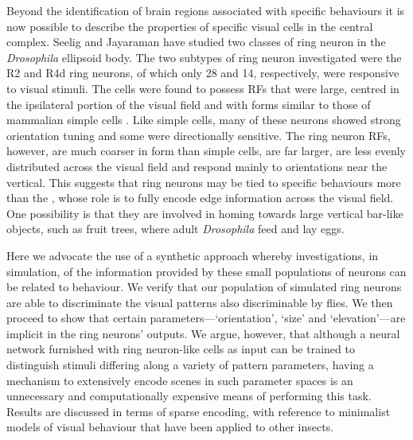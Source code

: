 Beyond the identification of brain regions associated with specific behaviours it is now possible to describe the properties of specific visual cells in the central complex. Seelig and Jayaraman \cite{Seelig2013} have studied two classes of ring neuron in the \emph{Drosophila} ellipsoid body.
The two subtypes of ring neuron investigated were the R2 and R4d ring neurons, of which only 28 and 14, respectively, were responsive to visual stimuli.
The cells were found to possess \acp{RF} that were large, centred in the ipsilateral portion of the visual field and with forms similar to those of mammalian simple cells \cite{Hubel1962}.
Like simple cells, many of these neurons showed strong orientation tuning and some were directionally sensitive.
The ring neuron \acp{RF}, however, are much coarser in form than simple cells, are far larger, are less evenly distributed across the visual field and respond mainly to orientations near the vertical.
This suggests that ring neurons may be tied to specific behaviours more than the , whose role is to fully encode edge information across the visual field.
One possibility is that they are involved in homing towards large vertical bar-like objects, such as fruit trees, where adult \emph{Drosophila} feed and lay eggs.

Here we advocate the use of a synthetic approach whereby investigations, in simulation, of the information provided by these small populations of neurons can be related to behaviour. We verify that our population of simulated ring neurons are able to discriminate the visual patterns also discriminable by flies.
We then proceed to show that certain parameters---`orientation', `size' and `elevation'---are implicit in the ring neurons' outputs.
We argue, however, that although a neural network furnished with ring neuron-like cells as input can be trained to distinguish stimuli differing along a variety of pattern parameters, having a mechanism to extensively encode scenes in such parameter spaces is an unnecessary and computationally expensive means of performing this task.
Results are discussed in terms of sparse encoding, with reference to minimalist models of visual behaviour that have been applied to other insects.
